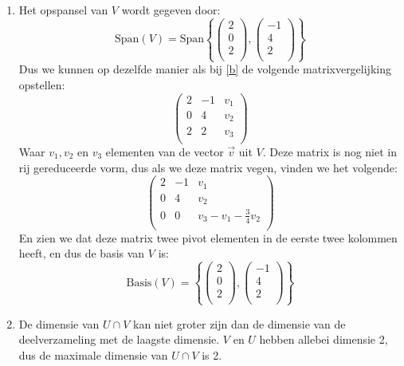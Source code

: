 \documentclass[12pt, a4paper]{article}
\begin{document}
\begin{enumerate}[(a.)]
\item
Het opspansel van $V$ wordt gegeven door:
\begin{equation}
    \text{Span}(V) = \text{Span}\left\{
        \begin{pmatrix}
            2 \\
            0 \\
            2 \\
        \end{pmatrix}
        ,
        \begin{pmatrix}
            -1 \\
            4 \\
            2 \\
        \end{pmatrix}
    \right\}
\end{equation}
Dus we kunnen op dezelfde manier als bij \ref{b} de volgende matrixvergelijking opstellen:
\begin{equation}
    \left(\begin{array}{cc|c}
        2 & -1 & v_1\\
        0 & 4 & v_2\\
        2 & 2 & v_3\\
    \end{array}\right)
\end{equation}
Waar $v_1, v_2$ en $v_3$ elementen van de vector $\vec{v}$ uit $V$. 
Deze matrix is nog niet in rij gereduceerde vorm, 
dus als we deze matrix vegen, vinden we het volgende:  
\begin{equation}
    \left(\begin{array}{cc|c}
        2 & -1 & v_1\\
        0 & 4 & v_2\\
        0 & 0 & v_3 - v_1 - \frac{3}{4}v_2\\
    \end{array}\right)
\end{equation}
En zien we dat deze matrix twee pivot elementen in de eerste twee kolommen heeft, 
en dus de basis van $V$ is:
\begin{equation}
    \text{Basis}(V) = \left\{
        \begin{pmatrix}
            2 \\
            0 \\
            2 \\
        \end{pmatrix}
        ,
        \begin{pmatrix}
            -1 \\
            4 \\
            2 \\
        \end{pmatrix}
    \right\}
\end{equation}
\item  
De dimensie van $U \cap V$ 
kan niet groter zijn dan de dimensie van de deelverzameling met de laagste dimensie.
$V$ en $U$ hebben allebei dimensie 2, dus de maximale dimensie van $U \cap V$ is 2.


\end{enumerate}
\end{document}
